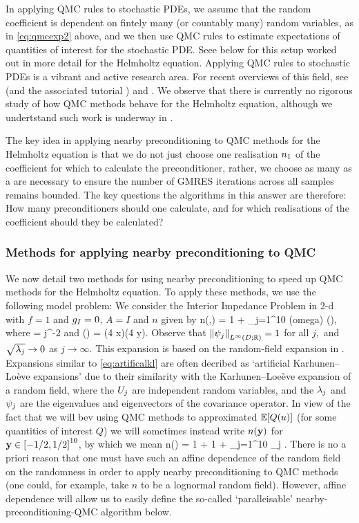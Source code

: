 In applying QMC rules to stochastic PDEs, we assume that the random coefficient is dependent on fintely many (or countably many) random variables, as in \cref{eq:qmcexp2} above, and we then use QMC rules to estimate expectations of quantities of interest for the stochastic PDE. Seee below for this setup worked out in more detail for the Helmholtz equation. Applying QMC rules to stochastic PDEs is a vibrant and active research area. For recent overviews of this field, see \cite{KuNu:16} (and the associated tutorial \cite{KuNU:18a}) and \cite{KuNu:18b}. We observe that there is currently no rigorous study of how QMC methods behave for the Helmholtz equation, although we undertstand such work is underway in \cite{GaKuSl}.

The key idea in applying nearby preconditioning to QMC methods for the Helmholtz equation is that we do not just choose one realisation $n_{1}$ of the coefficient for which to calculate the preconditioner, rather, we choose as many as a are necessary to ensure the number of GMRES iterations across all samples remains bounded. The key questions the algorithms in this  answer are therefore: How many preconditioners should one calculate, and for which realisations of the coefficient should they be calculated?

\subsubsection{Methods for applying nearby preconditioning to QMC}\label{sec:nbpcqmcnum}
We now detail two methods for using nearby preconditioning to speed up QMC methods for the Helmholtz equation. To apply these methods, we use the following model problem: We consider the Interior Impedance Problem in 2-d with $f=1$ and $g_{I}=0$, $A = I$ and $n$ given by
\beq\label{eq:artificialkl}
n(\omega,\bx) = 1 + \sum_{j=1}^{10} \Uj(omega) \sqrt{\lambdaj} \psij(\bx),
\eeq
where
\beqs
\sqrt{\lambdaj} = j^{-2}
\eeqs
and
\beqs
\psij(\bx) = \cos\mleft(4 x\mright)\cos\mleft(4 y\mright).
\eeqs
Observe that $\NLiDRR{\psij}=1$ for all $j,$ and $\sqrt{\lambda_{j}} \rightarrow 0$ as $j \rightarrow \infty.$ This expansion is based on the random-field expansion in \cite[Section 5.1]{GiGrKuScSl:19}. Expansions similar to \cref{eq:artificalkl} are often decribed as `artificial Karhunen--Lo\`eve expansions' due to their similarity with the Karhunen--Loe\`eve expansion of a random field, where the $U_{j}$ are independent random variables, and the $\lambda_{j}$ and $\psi_{j}$ are the eigenvalues and eigenvectors of the covariance operator. In view of the fact that we will bev using QMC methods to approximated $\EXP{Q(u)}$ (for some quantities of interest $Q$) we will sometimes instead write $n(\mathbf{y})$ for $\by \in \cube{10}$, by which we mean
\beqs
n(\by) = 1 + 1 + \sum_{j=1}^{10} \by_{j} \sqrt{\lambdaj} \psij.
\eeqs
There is no a priori reason that one must have such an affine dependence of the random field on the randomness in order to apply nearby preconditioning to QMC methods (one could, for example, take $n$ to be a lognormal random field). However, affine dependence will allow us to easily define the so-called `paralleisable' nearby-preconditioning-QMC algorithm below.

